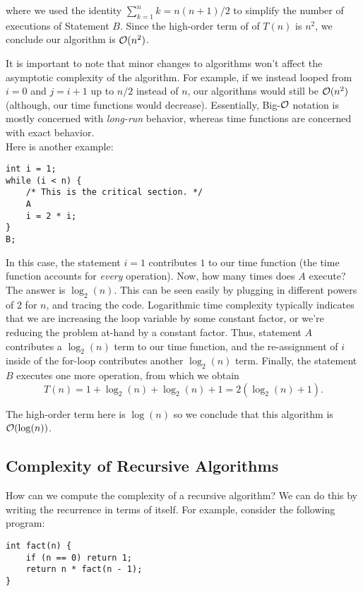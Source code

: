\noindent where we used the identity $\sum_{k=1}^{n} k = n(n + 1)/2$ to simplify the number of executions of Statement $B$. Since the high-order term of of $T(n)$ is $n^2$, we conclude our algorithm is $\mathcal{O}(n^{2})$. 

\noindent It is important to note that minor changes to algorithms won't affect the asymptotic complexity of the algorithm. For example, if we instead looped from $i = 0$ and $j = i + 1$ up to $n/2$ instead of $n$, our algorithms would still be $\mathcal{O}(n^2)$ (although, our time functions would decrease). Essentially, Big-$\mathcal{O}$ notation is mostly concerned with \textit{long-run} behavior, whereas time functions are concerned with exact behavior. \\

Here is another example:

\begin{lstlisting}
int i = 1;
while (i < n) {
    /* This is the critical section. */
    A
    i = 2 * i;
}
B;
\end{lstlisting}

\noindent In this case, the statement $i = 1$ contributes $1$ to our time function (the time function accounts for \textit{every} operation). Now, how many times does $A$ execute? The answer is $\log_{2}(n)$. This can be seen easily by plugging in different powers of $2$ for $n$, and tracing the code. Logarithmic time complexity typically indicates that we are increasing the loop variable by some constant factor, or we're reducing the problem at-hand by a constant factor. Thus, statement $A$ contributes a $\log_2(n)$ term to our time function, and the re-assignment of $i$ inside of the for-loop contributes another $\log_2(n)$ term. Finally, the statement $B$ executes one more operation, from which we obtain
\[
T(n) = 1 + \log_2(n) + \log_2(n) + 1 = 2(\log_2(n) + 1).
\]

\noindent The high-order term here is $\log(n)$ so we conclude that this algorithm is $\mathcal{O}(\log(n))$. \\

\subsection{Complexity of Recursive Algorithms}

How can we compute the complexity of a recursive algorithm? We can do this by writing the recurrence in terms of itself. For example, consider the following program:

\begin{lstlisting}
int fact(n) {
    if (n == 0) return 1;
    return n * fact(n - 1);
}
\end{lstlisting}

